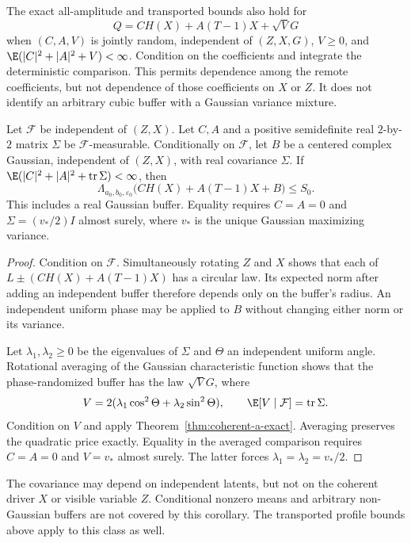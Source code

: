 The exact all-amplitude and transported bounds also hold for
\[
 Q=C H(X)+A(T-1)X+\sqrt V G
\]
when $(C,A,V)$ is jointly random, independent of $(Z,X,G)$, $V\ge0$,
and $\E(|C|^2+|A|^2+V)<\infty$. Condition on the coefficients and
integrate the deterministic comparison. This permits dependence
among the remote coefficients, but not dependence of those coefficients
on $X$ or $Z$. It does not identify an arbitrary cubic buffer with a
Gaussian variance mixture.

\begin{corollary}
\label{cor:coherent-improper}
Let $\mathcal F$ be independent of $(Z,X)$. Let $C,A$ and a positive
semidefinite real $2$-by-$2$ matrix $\Sigma$ be $\mathcal F$-measurable.
Conditionally on $\mathcal F$, let $B$ be a centered complex Gaussian,
independent of $(Z,X)$, with real covariance $\Sigma$. If
$\E(|C|^2+|A|^2+\operatorname{tr}\Sigma)<\infty$, then
\[
 \Lambda_{a_0,b_0,\varepsilon_0}
       \bigl(CH(X)+A(T-1)X+B\bigr)\le S_0.
\]
This includes a real Gaussian buffer. Equality requires $C=A=0$ and
$\Sigma=(v_*/2)I$ almost surely, where $v_*$ is the unique Gaussian
maximizing variance.
\end{corollary}
\begin{proof}
Condition on $\mathcal F$. Simultaneously rotating $Z$ and $X$ shows
that each of $L\pm(CH(X)+A(T-1)X)$ has a circular law. Its expected
norm after adding an independent buffer therefore depends only on
the buffer's radius. An independent uniform phase may be applied to
$B$ without changing either norm or its variance.

Let $\lambda_1,\lambda_2\ge0$ be the eigenvalues of $\Sigma$ and
$\Theta$ an independent uniform angle. Rotational averaging of the
Gaussian characteristic function shows that the phase-randomized
buffer has the law $\sqrt V G$, where
\[
 V=2(\lambda_1\cos^2\Theta+\lambda_2\sin^2\Theta),
 \qquad \E[V\mid\mathcal F]=\operatorname{tr}\Sigma.
\]
Condition on $V$ and apply Theorem~\ref{thm:coherent-a-exact}. Averaging
preserves the quadratic price exactly. Equality in the averaged
comparison requires $C=A=0$ and $V=v_*$ almost surely. The latter
forces $\lambda_1=\lambda_2=v_*/2$.
\end{proof}
The covariance may depend on independent latents, but not on the
coherent driver $X$ or visible variable $Z$. Conditional nonzero
means and arbitrary non-Gaussian buffers are not covered by this
corollary. The transported profile bounds above apply to this class
as well.

